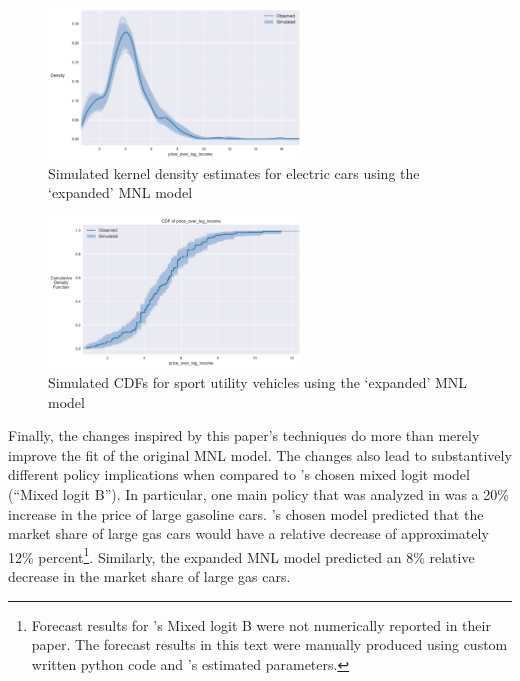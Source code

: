 \documentclass[preprint]{elsarticle}
\begin{document}
\begin{figure}
\centering
\includegraphics[width=0.6\textwidth]{kde-vehicle-choice-interaction-mnl-electric-price}
\caption{Simulated kernel density estimates for electric cars using the `expanded' MNL model}
\label{fig:new-mnl-electric-kde}
\end{figure}

\begin{figure}
\centering
\includegraphics[width=0.6\textwidth]{cdf-vehicle-choice-interaction-mnl-suv-price}
\caption{Simulated CDFs for sport utility vehicles using the `expanded' MNL model}
\label{fig:new-mnl-suv-cdf}
\end{figure}

Finally, the changes inspired by this paper's techniques do more than merely improve the fit of the original MNL model. The changes also lead to substantively different policy implications when compared to \citeauthor{brownstone_forecasting_1998}'s chosen mixed logit model (``Mixed logit B''). In particular, one main policy that was analyzed in \citet{brownstone_forecasting_1998} was a 20\% increase in the price of large gasoline cars. \citeauthor{brownstone_forecasting_1998}'s chosen model predicted that the market share of large gas cars would have a relative decrease of approximately 12\% percent\footnote{Forecast results for \citeauthor{brownstone_forecasting_1998}'s Mixed logit B were not numerically reported in their paper. The forecast results in this text were manually produced using custom written python code and \citeauthor{brownstone_forecasting_1998}'s estimated parameters.}. Similarly, the expanded MNL model predicted an 8\% relative decrease in the market share of large gas cars.
\end{document}
